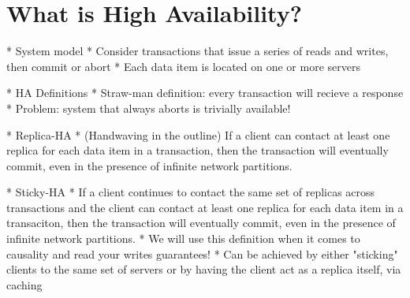 
\section{What is High Availability?}


* System model
	* Consider transactions that issue a series of reads and writes, then commit or abort
	* Each data item is located on one or more servers

* HA Definitions
	* Straw-man definition: every transaction will recieve a response
		* Problem: system that always aborts is trivially available!

* Replica-HA
	* (Handwaving in the outline) If a client can contact at least one replica for each data item in a transaction, then the transaction will eventually commit, even in the presence of infinite network partitions.

* Sticky-HA
	* If a client continues to contact the same set of replicas across transactions and the client can contact at least one replica for each data item in a transaciton, then the transaction will eventually commit, even in the presence of infinite network partitions.
	* We will use this definition when it comes to causality and read your writes guarantees!
	* Can be achieved by either "sticking" clients to the same set of servers or by having the client act as a replica itself, via caching 
